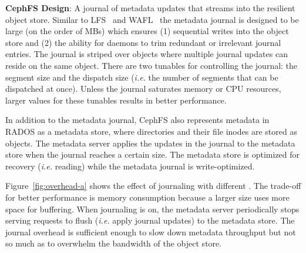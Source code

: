 \textbf{CephFS Design}: A journal of metadata updates that streams into the
resilient object store. Similar to LFS~\cite{rosenblum:acm1992-LFS} and
WAFL~\cite{hitz:wtec1994-WAFL} the metadata journal is designed to be large (on
the order of MBs) which ensures (1) sequential writes into the object store and
(2) the ability for daemons to trim redundant or irrelevant journal entries.
The journal is striped over objects where multiple journal updates can reside
on the same object. There are two tunables for controlling the journal: the segment size
and the dispatch size ({\it i.e.} the number of segments that can be dispatched
at once).  Unless the journal saturates memory or CPU resources, larger values
for these tunables results in better performance.

In addition to the metadata journal, CephFS also represents metadata in RADOS
as a metadata store, where directories and their file inodes are stored as
objects.  The metadata server applies the updates in the journal to the
metadata store when the journal reaches a certain size. The metadata store is
optimized for recovery ({\it i.e.} reading) while the metadata journal is
write-optimized.


Figure~\ref{fig:overhead-a} shows the effect of journaling with different
.  The trade-off for better performance
is memory consumption because a larger
 size uses more space for buffering.
When journaling is on, the metadata server periodically stops serving requests
to flush ({\it i.e.} apply journal updates) to the metadata store.  The journal
overhead is sufficient enough to slow down metadata throughput but not so much
as to overwhelm the bandwidth of the object store.

